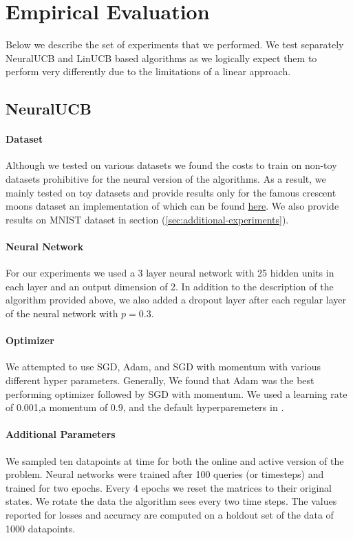 \documentclass{article}
\begin{document}
\section{Empirical Evaluation}
Below we describe the set of experiments that we performed.
We test separately NeuralUCB and LinUCB based algorithms as we logically expect them to perform
very differently due to the limitations of a linear approach.



\subsection{NeuralUCB}
\paragraph{Dataset}
Although we tested on various datasets we found the costs to train on non-toy datasets prohibitive for the neural version of the algorithms.
As a result, we mainly tested on toy datasets and provide results only for the famous crescent moons dataset an implementation of which can
be found
\href{https://scikit-learn.org/stable/modules/generated/sklearn.datasets.make_moons.html}{here}.
We also provide results on MNIST dataset in section (\ref{sec:additional-experiments}).

\paragraph{Neural Network}
For our experiments we used a 3 layer neural network with 25 hidden units in each layer and an output dimension of 2.
In addition to the description of the algorithm provided above, we also added a dropout layer after each regular layer of the neural network with
$p =0.3$.

\paragraph{Optimizer}
We attempted to use SGD, Adam, and SGD with momentum with various different hyper parameters.
Generally, We found that Adam was the best performing optimizer followed by SGD with momentum.
We used a learning rate of 0.001,a momentum of 0.9, and the default hyperparemeters in \cite{adam}.

\paragraph{Additional Parameters}
We sampled ten datapoints at time for both the online and active version of the problem. Neural networks were trained after 100 queries (or timesteps)
and trained for two epochs. Every 4 epochs we reset the matrices to their original states. We rotate the data the algorithm sees every two time steps.
The values reported for losses and accuracy are computed on a holdout set of the data of 1000 datapoints.
\end{document}

